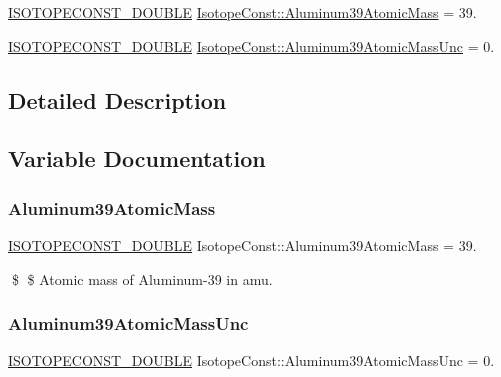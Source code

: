 \begin{DoxyCompactItemize}
\item 
\mbox{\hyperlink{group___isotope_const-_macros_ga8f45a7272ce02c0b4c65c44636ed719a}{I\+S\+O\+T\+O\+P\+E\+C\+O\+N\+S\+T\+\_\+\+D\+O\+U\+B\+LE}} \mbox{\hyperlink{group___isotope_const-_aluminum-_al39_ga29e985567a7088ccb1eefda8158672f3}{Isotope\+Const\+::\+Aluminum39\+Atomic\+Mass}} = 39.
\item 
\mbox{\hyperlink{group___isotope_const-_macros_ga8f45a7272ce02c0b4c65c44636ed719a}{I\+S\+O\+T\+O\+P\+E\+C\+O\+N\+S\+T\+\_\+\+D\+O\+U\+B\+LE}} \mbox{\hyperlink{group___isotope_const-_aluminum-_al39_gae654b8668791455906df7c1320ad1002}{Isotope\+Const\+::\+Aluminum39\+Atomic\+Mass\+Unc}} = 0.
\end{DoxyCompactItemize}


\subsection{Detailed Description}


\subsection{Variable Documentation}
\mbox{\label{group___isotope_const-_aluminum-_al39_ga29e985567a7088ccb1eefda8158672f3}} 
\subsubsection{\texorpdfstring{Aluminum39\+Atomic\+Mass}{Aluminum39AtomicMass}}
{\footnotesize\ttfamily \mbox{\hyperlink{group___isotope_const-_macros_ga8f45a7272ce02c0b4c65c44636ed719a}{I\+S\+O\+T\+O\+P\+E\+C\+O\+N\+S\+T\+\_\+\+D\+O\+U\+B\+LE}} Isotope\+Const\+::\+Aluminum39\+Atomic\+Mass = 39.}

\$ \$ Atomic mass of Aluminum-\/39 in amu. \mbox{\label{group___isotope_const-_aluminum-_al39_gae654b8668791455906df7c1320ad1002}} 
\subsubsection{\texorpdfstring{Aluminum39\+Atomic\+Mass\+Unc}{Aluminum39AtomicMassUnc}}
{\footnotesize\ttfamily \mbox{\hyperlink{group___isotope_const-_macros_ga8f45a7272ce02c0b4c65c44636ed719a}{I\+S\+O\+T\+O\+P\+E\+C\+O\+N\+S\+T\+\_\+\+D\+O\+U\+B\+LE}} Isotope\+Const\+::\+Aluminum39\+Atomic\+Mass\+Unc = 0.}

